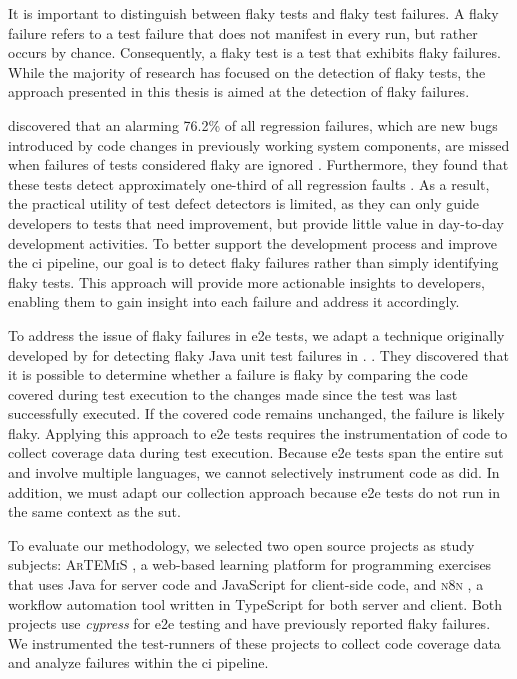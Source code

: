 It is important to distinguish between flaky tests and flaky test failures.
A flaky failure refers to a test failure that does not manifest in every run, but rather occurs by chance.
Consequently, a flaky test is a test that exhibits flaky failures.
While the majority of research has focused on the detection of flaky tests, the approach presented in this thesis is aimed at the detection of flaky failures.

 discovered that an alarming 76.2\% of all regression failures, which are new bugs introduced by code changes in previously working system components, are missed when failures of tests considered flaky are ignored \autocite{haben_importance_2023}.
Furthermore, they found that these tests detect approximately one-third of all regression faults \autocite{haben_importance_2023}.
As a result, the practical utility of test defect detectors is limited, as they can only guide developers to tests that need improvement, but provide little value in day-to-day development activities.
To better support the development process and improve the \ac{ci} pipeline, our goal is to detect flaky failures rather than simply identifying flaky tests.
This approach will provide more actionable insights to developers, enabling them to gain insight into each failure and address it accordingly.

To address the issue of flaky failures in \ac{e2e} tests, we adapt a technique originally developed by \citeauthor*{bell_deflaker_2018} for detecting flaky Java unit test failures in . \autocite{bell_deflaker_2018}.
They discovered that it is possible to determine whether a failure is flaky by comparing the code covered during test execution to the changes made since the test was last successfully executed.
If the covered code remains unchanged, the failure is likely flaky.
Applying this approach to \ac{e2e} tests requires the instrumentation of code to collect coverage data during test execution.
Because \ac{e2e} tests span the entire \ac{sut} and involve multiple languages, we cannot selectively instrument code as \citeauthor*{bell_deflaker_2018} did.
In addition, we must adapt our collection approach because \ac{e2e} tests do not run in the same context as the \ac{sut}.

To evaluate our methodology, we selected two open source projects as study subjects:
\textsc{ArTEMiS} \autocite{krusche_artemis_2018}, a web-based learning platform for programming exercises that uses Java for server code and JavaScript for client-side code, and \textsc{n8n} \autocite{noauthor_n8n_2023}, a workflow automation tool written in TypeScript for both server and client.
Both projects use \textit{cypress} \autocite{noauthor_cypress-iocypress_2023} for \ac{e2e} testing and have previously reported flaky failures.
We instrumented the test-runners of these projects to collect code coverage data and analyze failures within the \ac{ci} pipeline.

